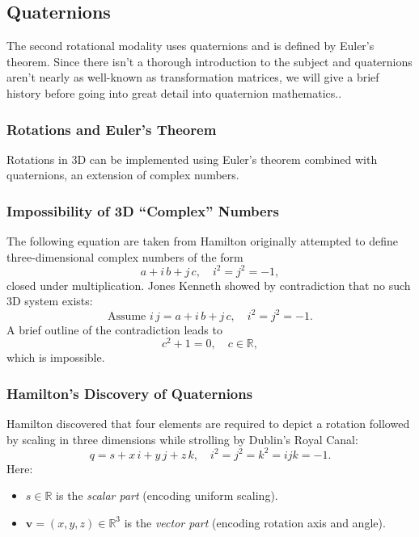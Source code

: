 \documentclass[12pt]{article}
\begin{document}
\subsection{Quaternions}
The second rotational modality uses quaternions and is defined by Euler's theorem. Since there isn't a thorough introduction to the subject and quaternions aren't nearly as well-known as transformation matrices, we will give a brief history before going into great detail into quaternion mathematics.\cite{ref20}.\\

\subsubsection{Rotations and Euler’s Theorem}
Rotations in 3D can be implemented using Euler’s theorem combined with quaternions, an extension of complex numbers\cite{ref20}.

\subsubsection{Impossibility of 3D ``Complex'' Numbers}
The following equation are taken from \cite{ref20}
Hamilton originally attempted to define three-dimensional complex numbers of the form\\
\[
  a + i\,b + j\,c,\quad i^2 = j^2 = -1,
\]
closed under multiplication. Jones Kenneth\cite{jones1984kenneth} showed by contradiction that no such 3D system exists:
\[
  \text{Assume }i\,j = a + i\,b + j\,c,\quad
  i^2 = j^2 = -1.
\]
A brief outline of the contradiction leads to
\[
  c^2 + 1 = 0,\quad c\in\mathbb{R},
\]
which is impossible.

\subsubsection{Hamilton’s Discovery of Quaternions}
Hamilton discovered that four elements are required to depict a rotation followed by scaling in three dimensions while strolling by Dublin's Royal Canal: \cite{ref20}
\[
  q = s + x\,i + y\,j + z\,k,
  \quad
  i^2 = j^2 = k^2 = ijk = -1.
\]
Here:
\begin{itemize}
  \item $s\in\mathbb{R}$ is the \emph{scalar part} (encoding uniform scaling).
  \item $\mathbf{v} = (x,y,z)\in\mathbb{R}^3$ is the \emph{vector part} (encoding rotation axis and angle).
\end{itemize}
\end{document}
